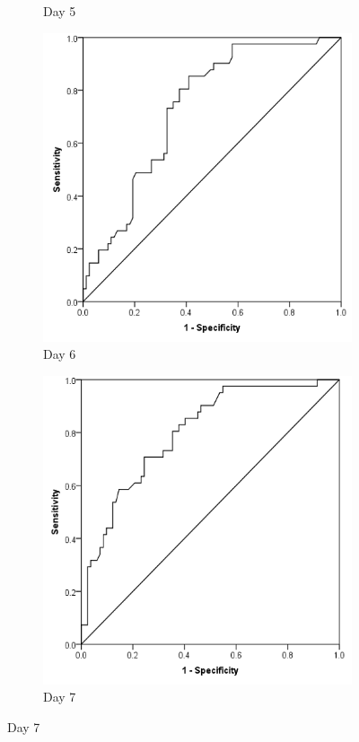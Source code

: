 \begin{figure}[t]
\begin{subfigure}{0.3\textwidth}
		\caption{Day 5}
		\label{fig:crp_comp_ROC_infection_D5}
	\end{subfigure}
	\begin{subfigure}{0.3\textwidth}
		\centering
		\includegraphics[width=\textwidth]{Figures/crp_comp_ROC_infection_D6}
		\caption{Day 6}		
		\label{fig:crp_comp_ROC_infection_D6}
	\end{subfigure}
	\begin{subfigure}{0.3\textwidth}
		\centering
		\includegraphics[width=\textwidth]{Figures/crp_comp_ROC_infection_D7}
		\caption{Day 7}
		\label{fig:crp_comp_ROC_infection_D7}
	\end{subfigure}
	

\end{figure}
